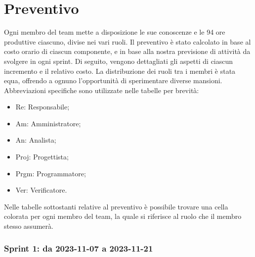 \documentclass[10pt, a4paper]{article}
\begin{document}
{{{{{{{{\newpage

\section{Preventivo}
Ogni membro del team mette a disposizione le sue conoscenze e le 94 ore produttive ciascuno, divise nei vari ruoli. Il preventivo è stato calcolato in base al costo orario di ciascun componente, e in base alla nostra previsione di attività da svolgere in ogni sprint. Di seguito, vengono dettagliati gli aspetti di ciascun incremento e il relativo costo. La distribuzione dei ruoli tra i membri è stata equa, offrendo a ognuno l'opportunità di sperimentare diverse mansioni. Abbreviazioni specifiche sono utilizzate nelle tabelle per brevità:
\begin{itemize}
    \item Re: Responsabile;
    \item Am: Amministratore;
    \item An: Analista;
    \item Proj: Progettista;
    \item Prgm: Programmatore;
    \item Ver: Verificatore.
\end{itemize}
Nelle tabelle sottostanti relative al preventivo è possibile trovare una cella colorata per ogni membro del team, la quale si riferisce al ruolo che il membro stesso assumerà.
\subsubsection{Sprint 1: da 2023-11-07 a 2023-11-21}
}}}}}}}}
\end{document}
